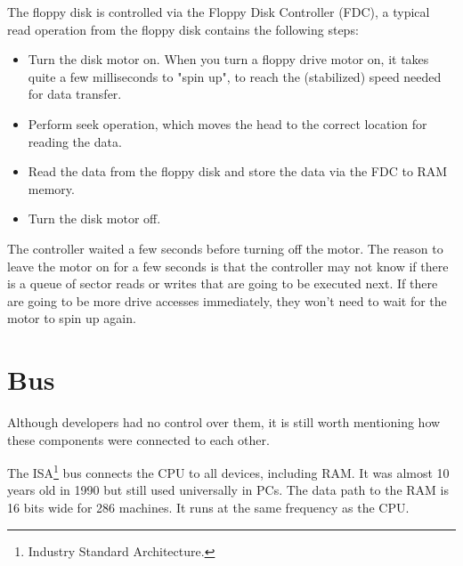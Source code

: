 \documentclass[book.tex]{subfiles}
\begin{document}
\par
The floppy disk is controlled via the Floppy Disk Controller (FDC), a typical read operation from the floppy disk contains the following steps:
\begin{itemize}
  \item Turn the disk motor on. When you turn a floppy drive motor on, it takes quite a few milliseconds to "spin up", to reach the (stabilized) speed needed for data transfer.
  \item Perform seek operation, which moves the head to the correct location for reading the data.
  \item Read the data from the floppy disk and store the data via the FDC to RAM memory.
  \item Turn the disk motor off. 
\end{itemize}

The controller waited a few seconds before turning off the motor. The reason to leave the motor on for a few seconds is that the controller may not know if there is a queue of sector reads or writes that are going to be executed next. If there are going to be more drive accesses immediately, they won't need to wait for the motor to spin up again.\\




\section{Bus}
Although developers had no control over them, it is still worth mentioning how these components were connected to each other.\\ 
\par

The ISA\footnote{Industry Standard Architecture.} bus connects the CPU to all devices, including RAM. It was almost 10 years old in 1990 but still used universally in PCs. The data path to the RAM is 16 bits wide for 286 machines. It runs at the same frequency as the CPU.\\
\par
\end{document}
